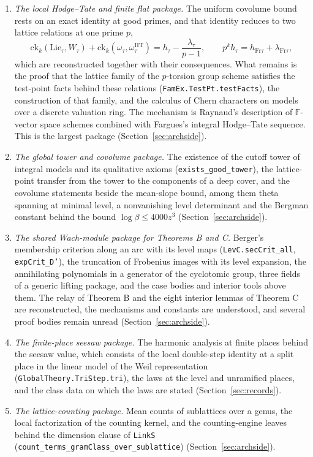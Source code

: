 \documentclass[11pt,letterpaper]{article}
\numberwithin{equation}{section}
\begin{document}
\begin{enumerate}
\item \emph{The local Hodge--Tate and finite flat package.} The uniform covolume bound rests on an exact identity at good primes, and that identity reduces to two lattice relations at one prime $p$,
\[
\mathrm{ck}_k(\mathrm{Lie}_\tau,W_\tau)+\mathrm{ck}_k(\omega_\tau,\omega^{\mathrm{HT}}_\tau)=h_\tau-\frac{\lambda_\tau}{p-1},\qquad p^kh_\tau=h_{\mathrm{Fr}\tau}+\lambda_{\mathrm{Fr}\tau},
\]
which are reconstructed together with their consequences. What remains is the proof that the lattice family of the $p$-torsion group scheme satisfies the test-point facts behind these relations (\texttt{FamEx.TestPt.testFacts}), the construction of that family, and the calculus of Chern characters on models over a discrete valuation ring. The mechanism is Raynaud's description of $\mathbb F$-vector space schemes combined with Fargues's integral Hodge--Tate sequence. This is the largest package (Section~\ref{sec:archside}).
\item \emph{The global tower and covolume package.} The existence of the cutoff tower of integral models and its qualitative axioms (\texttt{exists\_good\_tower}), the lattice-point transfer from the tower to the components of a deep cover, and the covolume statements beside the mean-slope bound, among them theta spanning at minimal level, a nonvanishing level determinant and the Bergman constant behind the bound $\log\beta\le4000z^3$ (Section~\ref{sec:archside}).
\item \emph{The shared Wach-module package for Theorems B and C.} Berger's membership criterion along an arc with its level maps (\texttt{LevC.secCrit\_all}, \texttt{expCrit\_D'}), the truncation of Frobenius images with its level expansion, the annihilating polynomials in a generator of the cyclotomic group, three fields of a generic lifting package, and the case bodies and interior tools above them. The relay of Theorem B and the eight interior lemmas of Theorem C are reconstructed, the mechanisms and constants are understood, and several proof bodies remain unread (Section~\ref{sec:archside}).
\item \emph{The finite-place seesaw package.} The harmonic analysis at finite places behind the seesaw value, which consists of the local double-step identity at a split place in the linear model of the Weil representation (\texttt{GlobalTheory.TriStep.tri}), the laws at the level and unramified places, and the class data on which the laws are stated (Section~\ref{sec:records}).
\item \emph{The lattice-counting package.} Mean counts of sublattices over a genus, the local factorization of the counting kernel, and the counting-engine leaves behind the dimension clause of \texttt{LinkS} (\texttt{count\_terms\_gramClass\_over\_sublattice}) (Section~\ref{sec:archside}).

\end{enumerate}
\end{document}
